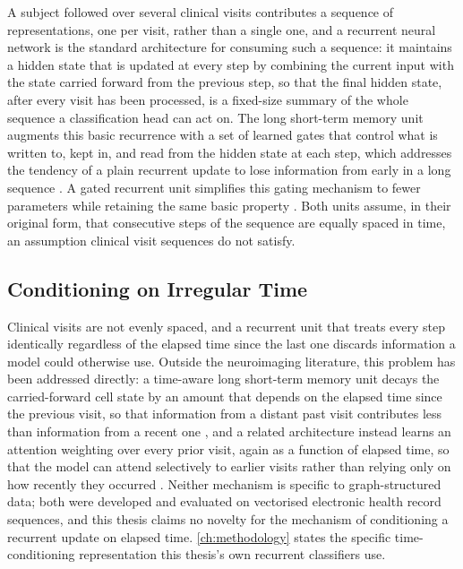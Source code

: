 A subject followed over several clinical visits contributes a sequence of representations,
one per visit, rather than a single one, and a recurrent neural network is the standard
architecture for consuming such a sequence: it maintains a hidden state that is updated at
every step by combining the current input with the state carried forward from the previous
step, so that the final hidden state, after every visit has been processed, is a
fixed-size summary of the whole sequence a classification head can act on. The long
short-term memory unit augments this basic recurrence with a set of learned gates that
control what is written to, kept in, and read from the hidden state at each step, which
addresses the tendency of a plain recurrent update to lose information from early in a long
sequence \parencite{hochreiter1997lstm}. A gated recurrent unit simplifies this gating
mechanism to fewer parameters while retaining the same basic property
\parencite{cho2014gru}. Both units assume, in their original form, that consecutive steps
of the sequence are equally spaced in time, an assumption clinical visit sequences do not
satisfy.

\subsection{Conditioning on Irregular Time}\label{sec:time-conditioning-background}

Clinical visits are not evenly spaced, and a recurrent unit that treats every step
identically regardless of the elapsed time since the last one discards information a
model could otherwise use. Outside the neuroimaging literature, this problem has been
addressed directly: a time-aware long short-term memory unit decays the carried-forward
cell state by an amount that depends on the elapsed time since the previous visit, so that
information from a distant past visit contributes less than information from a recent one
\parencite{baytas2017tlstm}, and a related architecture instead learns an attention
weighting over every prior visit, again as a function of elapsed time, so that the model
can attend selectively to earlier visits rather than relying only on how recently they
occurred \parencite{zhang2019attain}. Neither mechanism is specific to graph-structured
data; both were developed and evaluated on vectorised electronic health record sequences,
and this thesis claims no novelty for the mechanism of conditioning a recurrent update on
elapsed time. \autoref{ch:methodology} states the specific time-conditioning representation
this thesis's own recurrent classifiers use.

